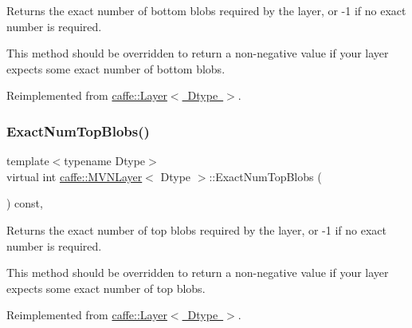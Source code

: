 Returns the exact number of bottom blobs required by the layer, or -\/1 if no exact number is required. 

This method should be overridden to return a non-\/negative value if your layer expects some exact number of bottom blobs. 

Reimplemented from \mbox{\hyperlink{classcaffe_1_1_layer_a8e5ee0494d85f5f55fc4396537cbc60f}{caffe\+::\+Layer$<$ Dtype $>$}}.

\mbox{\label{classcaffe_1_1_m_v_n_layer_ae10d9ef135adf3cd25e86ce06188c814}} 
\subsubsection{\texorpdfstring{Exact\+Num\+Top\+Blobs()}{ExactNumTopBlobs()}\hspace{0.1cm}{\footnotesize\ttfamily [1/2]}}
{\footnotesize\ttfamily template$<$typename Dtype$>$ \\
virtual int \mbox{\hyperlink{classcaffe_1_1_m_v_n_layer}{caffe\+::\+M\+V\+N\+Layer}}$<$ Dtype $>$\+::Exact\+Num\+Top\+Blobs (\begin{DoxyParamCaption}{ }\end{DoxyParamCaption}) const\hspace{0.3cm}{\ttfamily [inline]}, {\ttfamily [virtual]}}



Returns the exact number of top blobs required by the layer, or -\/1 if no exact number is required. 

This method should be overridden to return a non-\/negative value if your layer expects some exact number of top blobs. 

Reimplemented from \mbox{\hyperlink{classcaffe_1_1_layer_a64e2ca72c719e4b2f1f9216ccfb0d37f}{caffe\+::\+Layer$<$ Dtype $>$}}.

\mbox{\label{classcaffe_1_1_m_v_n_layer_ae10d9ef135adf3cd25e86ce06188c814}} 
